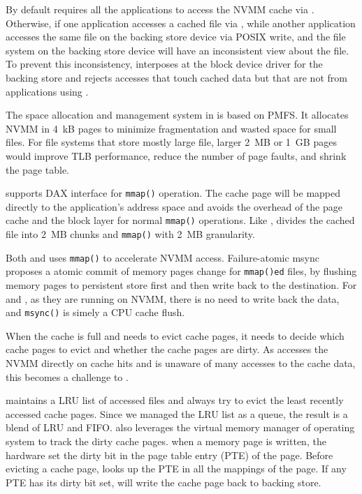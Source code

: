By default \CChell{} requires all the applications to access the NVMM cache via
\lib{}.  Otherwise, if one application accesses a cached file via \CChell{}, while another
application accesses the same file on the backing store device via POSIX write,
\CChell{} and the file system on the backing store device will have an
inconsistent view about the file.  To prevent this inconsistency, \drv{}
interposes at the block device driver for the backing store and rejects
accesses that touch cached data but that are not from applications using \lib{}.


The space allocation and management system in \drv{} is based on PMFS.  It
allocates NVMM in 4~kB pages to minimize fragmentation and wasted space for
small files.  For file systems that store mostly large file, larger 2~MB or
1~GB pages would improve
TLB performance, reduce the number of page faults, and shrink the page table.

\CChell supports DAX interface for \texttt{mmap()} operation.
The cache page will be mapped directly to the application's
address space and avoids the overhead of the page cache and the block layer
for normal \texttt{mmap()} operations.
Like \DAChell{}, \CChell{} divides the cached file into 2~MB chunks and
\texttt{mmap()} with 2~MB granularity.

Both \DAChell{} and \CChell uses \texttt{mmap()} to accelerate NVMM access.
Failure-atomic msync~\cite{atomicmsync} proposes a atomic commit of memory
pages change for \texttt{mmap()ed} files, by flushing memory pages to persistent
store first and then write back to the destination. For \DAChell{} and \CChell{}, as they are running on NVMM, there is no need to write back the data, and
\texttt{msync()} is simely a CPU cache flush.

When the cache is full and \drv{}
needs to evict cache pages, it needs to decide which cache pages to evict
and whether the cache pages are dirty. As \lib{} accesses the NVMM directly
on cache hits and \drv{} is unaware of many accesses to the cache data, this
becomes a challenge to \drv{}.

\drv{} maintains a LRU list of accessed files and always try to evict the least
recently accessed cache pages. Since we managed the LRU list as a queue,
the result is a blend of LRU and FIFO.
\CChell{} also leverages the virtual memory manager of operating system to
track the dirty cache pages. 
when a memory page is written, the hardware set the dirty bit in the 
page table entry (PTE) of the page. Before evicting a cache page,
\drv{} looks up the PTE in all the mappings of the page.  If
any PTE has its dirty bit set, \drv{} will write the cache page back to
backing store.

